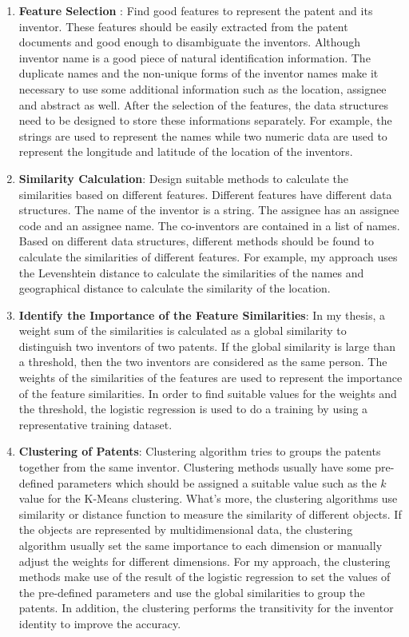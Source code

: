 \begin{enumerate}

\item \textbf{Feature Selection} : Find good features to represent the patent and its inventor. These features should be easily extracted from the patent documents and good enough to disambiguate the inventors. Although inventor name is a good piece of natural identification information. The duplicate names  and the non-unique forms of the inventor names make it necessary to use some additional information such as the location, assignee and abstract  as well. After the selection of the features, the data structures need to be designed to store these informations separately. For example, the strings are used to represent the names while two numeric data are used to represent the longitude and latitude of the location of the inventors.

\item \textbf{Similarity Calculation}: Design suitable methods to calculate the similarities based on different features.  Different features have different data structures. The name of the inventor is a string. The assignee has an assignee code and an assignee name. The co-inventors are contained in a list of names. Based on different data structures, different methods should be found to calculate the similarities of different features. For example, my approach uses the Levenshtein distance\cite{682181} to calculate the similarities of the names and geographical distance to calculate the similarity of the location.

\item \textbf{Identify the Importance of the Feature Similarities}: In my thesis, a weight sum of the similarities is calculated as a global similarity to distinguish two inventors of two patents. If the global similarity is large than a threshold, then the two inventors are considered as the same person. The weights of the similarities of the features are used to represent the importance of the feature similarities. In order to find suitable values for the weights and the threshold, the logistic regression is used to do a training by using a representative training dataset.

\item \textbf{Clustering of Patents}: Clustering algorithm tries to groups the patents together from the same inventor.  Clustering methods usually have some pre-defined parameters which should be assigned a suitable value such as the $k$ value for the K-Means clustering. What's more, the clustering algorithms use similarity or distance function to measure the similarity of different objects. If the objects are represented by multidimensional data, the clustering algorithm  usually set the same importance to each dimension or manually adjust the weights for different dimensions. For my approach, the clustering methods make use of the result of the logistic regression to set the values of the pre-defined parameters and use the global similarities to group the patents. In addition, the clustering performs the transitivity for the inventor identity to improve the accuracy. 


\end{enumerate}
